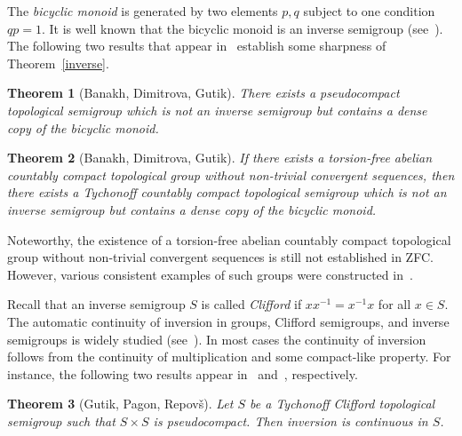 \documentclass[12pt, twoside, leqno]{article}
\newtheorem{theorem}{Theorem}[section]
\theoremstyle{definition}
\numberwithin{equation}{section}
\begin{document}
The {\em bicyclic monoid} is generated by two elements $p,q$ subject to one condition $qp=1$. It is well known that the bicyclic monoid is an inverse semigroup (see~\cite[Chapter 3.4]{Lawson}). 
The following two results that appear in~\cite[Theorem 6.1 and Theorem 6.6]{BDG} establish some sharpness of Theorem~\ref{inverse}.

\begin{theorem}[Banakh, Dimitrova, Gutik]
There exists a pseudocompact topological semigroup which is not an inverse semigroup but contains a dense copy of the bicyclic monoid.
\end{theorem}

\begin{theorem}[Banakh, Dimitrova, Gutik]
If there exists a torsion-free abelian countably compact topological group without non-trivial convergent sequences, then there exists a Tychonoff countably compact topological semigroup which is not an inverse semigroup but contains a dense copy of the bicyclic monoid.
\end{theorem}

Noteworthy, the existence of a torsion-free abelian countably compact topological group without non-trivial convergent sequences is still not established in ZFC. However, various consistent examples of such groups were constructed in~\cite{BRT, BCST, DT,D,GTW,HvM, KTW, T1,T2}.



Recall that an inverse semigroup $S$ is called {\em Clifford} if $xx^{-1}=x^{-1}x$ for all $x\in S$. The automatic continuity of inversion in groups, Clifford semigroups, and inverse semigroups is widely studied (see~\cite{BG, BR, Brand, Ellis, GR, Pfi, Rez, Roma, Tka}). In most cases the continuity of inversion follows from the continuity of multiplication and some compact-like property. For instance, the following two results appear in~\cite[Corollary 2]{GR} and~\cite[Theorem 2]{BG}, respectively.




\begin{theorem}[Gutik, Pagon, Repov\v{s}]\label{GR}
Let $S$ be a Tychonoff Clifford topological semigroup such that $S{\times}S$ is pseudocompact. Then inversion is continuous in $S$. 
\end{theorem}
\end{document}

